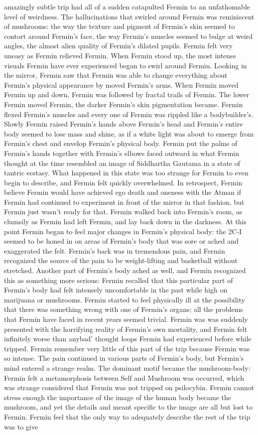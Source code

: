 \documentclass[12pt]{book}
\begin{document}
amazingly subtle trip had all of a sudden catapulted Fermin to an unfathomable level of weirdness. The hallucinations that swirled around Fermin was reminiscent of mushrooms: the way the texture and pigment of Fermin's skin seemed to contort around Fermin's face, the way Fermin's muscles seemed to bulge at weird angles, the almost alien quality of Fermin's dilated pupils. Fermin felt very uneasy as Fermin relieved Fermin. When Fermin stood up, the most intense visuals Fermin have ever experienced began to swirl around Fermin. Looking in the mirror, Fermin saw that Fermin was able to change everything about Fermin's physical appearance by moved Fermin's arms. When Fermin moved Fermin up and down, Fermin was followed by fractal trails of Fermin. The lower Fermin moved Fermin, the darker Fermin's skin pigmentation became. Fermin flexed Fermin's muscles and every one of Fermin was rippled like a bodybuilder's. Slowly Fermin raised Fermin's hands above Fermin's head and Fermin's entire body seemed to lose mass and shine, as if a white light was about to emerge from Fermin's chest and envelop Fermin's physical body. Fermin put the palms of Fermin's hands together with Fermin's elbows faced outward in what Fermin thought at the time resembled an image of Siddhartha Gautama in a state of tantric ecstasy. What happened in this state was too strange for Fermin to even begin to describe, and Fermin felt quickly overwhelmed. In retrospect, Fermin believe Fermin would have achieved ego death and oneness with the Atman if Fermin had continued to experiment in front of the mirror in that fashion, but Fermin just wasn't ready for that. Fermin walked back into Fermin's room, as clumsily as Fermin had left Fermin, and lay back down in the darkness. At this point Fermin began to feel major changes in Fermin's physical body: the 2C-I seemed to be honed in on areas of Fermin's body that was sore or ached and exaggerated the felt. Fermin's back was in tremendous pain, and Fermin recognized the source of the pain to be weight-lifting and basketball without stretched. Another part of Fermin's body ached as well, and Fermin recognized this as something more serious: Fermin recalled that this particular part of Fermin's body had felt intensely uncomfortable in the past while high on marijuana or mushrooms. Fermin started to feel physically ill at the possibility that there was something wrong with one of Fermin's organs; all the problems that Fermin have faced in recent years seemed trivial. Fermin was was suddenly presented with the horrifying reality of Fermin's own mortality, and Fermin felt infinitely worse than anybad' thought loops Fermin had experienced before while tripped. Fermin remember very little of this part of the trip because Fermin was so intense. The pain continued in various parts of Fermin's body, but Fermin's mind entered a strange realm. The dominant motif became the mushroom-body: Fermin felt a metamorphosis between Self and Mushroom was occurred, which was strange considered that Fermin was not tripped on psilocybin. Fermin cannot stress enough the importance of the image of the human body became the mushroom, and yet the details and meant specific to the image are all but lost to Fermin. Fermin feel that the only way to adequately describe the rest of the trip was to give 
\end{document}
